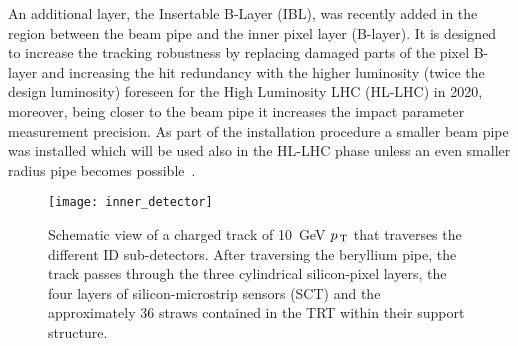 An additional layer, the Insertable B-Layer (IBL), was recently added in the
region between the beam pipe and the inner pixel layer (B-layer). It is designed
to increase the tracking robustness by replacing damaged parts of the pixel
B-layer and increasing the hit redundancy with the higher luminosity (twice
the design luminosity) foreseen for the High Luminosity LHC (HL-LHC) in 2020,
moreover, being closer to the beam pipe it increases the impact parameter
measurement precision. As part of the installation procedure a smaller beam pipe
was installed which will be used also in the HL-LHC phase unless an even smaller
radius pipe becomes possible~\cite{IBL}.

\begin{figure}[!h]
  \centering
    \texttt{[image: inner\_detector]}
    \caption{Schematic view of a charged track of 10~GeV $p_\mathrm{\, T}$ that traverses
      the different ID sub-detectors. After traversing the beryllium pipe, the
      track passes through the three cylindrical silicon-pixel layers, the four
      layers of silicon-microstrip sensors (SCT) and the approximately 36 straws
      contained in the TRT within their support structure.}
    \label{fig:id}
\end{figure}
